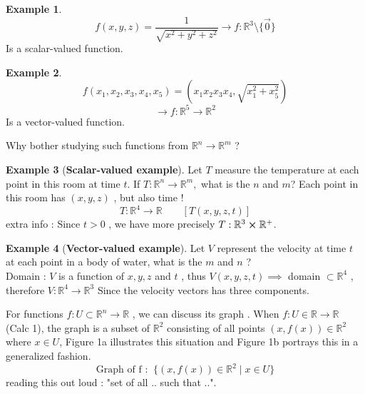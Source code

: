 \documentclass[
	12pt,
	]{article}
\newcommand{\Rn}{\mathbb{R}^{n}}
\newcommand{\R}{\mathbb{R}}
\newcommand{\Rm}{\mathbb{R}^{m}}
\theoremstyle{custom}
\theoremstyle{custom}
\theoremstyle{custom}
\theoremstyle{custom}
\theoremstyle{custom}
\theoremstyle{definition}
\newtheorem{example}{Example}[section]
\theoremstyle{example}
\theoremstyle{note}
\theoremstyle{remark}
\theoremstyle{example}
\newcounter{theo}[section]\setcounter{theo}{0}
\numberwithin{equation}{subsection}
\begin{document}
	\begin{example}
		$$ f(x,y,z) = \frac{1}{\sqrt{x^{2}+y^{2}+z^{2}}} \xrightarrow{} f: \mathbb{R}^{3} \text{\textbackslash}  \{\vec{0}\} $$ 
		Is a scalar-valued function.
	\end{example}
	
	\begin{example}
		$$ f(x_{1} , x_{2}, x_{3},x_{4},x_{5}) = \left(x_{1}x_{2}x_{3}x_{4} , \sqrt{x_{1}^{2}+x_{5}^{2}}\right)$$
		$$ \xrightarrow{	} f: \mathbb{R}^{5} \to \mathbb{R}^{2}$$
		Is a vector-valued function.
	\end{example}
	
	\noindent Why bother studying such functions from $ \Rn \to \Rm $ ? 
	
	\begin{example}[\textbf{Scalar-valued example}] 
		Let $ T $ measure the temperature at each point in this room at time $t$. If $ T : \Rn \to \Rm, $ what is the $n$ and $ m $? Each point in this room has $(x,y,z) $ , but also time !
			$$ T : \mathbb{R}^{4} \to \mathbb{R} \qquad [T(x,y,z,t)]$$
			extra info : Since $t>0$ , we have more precisely $T : \mathbb{R}^{3} \cross \mathbb{R}^{+}$.
	\end{example}
	
	\begin{example}[\textbf{Vector-valued example}] 
		Let $V$ represent the velocity at time $t$ at each point in a body of water, what is the $m$ and $n$ ? \\
			Domain : $V$ is a function of $x,y,z$ and $t$ , thus $V(x,y,z,t) \implies$ domain $\subset  \mathbb{R}^{4}$ , therefore $V : \mathbb{R}^{4} \to \mathbb{R}^{3}$ Since the velocity vectors has three components.
	\end{example}
	
	 For functions $f: U \subset \Rn \to \R$ , we can discuss its graph . When $f : U \in \R \to \R$ (Calc 1), the graph is a subset of $\mathbb{R}^{2}$ consisting of all points $(x,f(x)) \in \mathbb{R}^{2}$ where $x\in U$, Figure 1a illustrates this situation and Figure 1b portrays this in a generalized fashion. 
	$$ \text{Graph of f : } \ \{(x,f(x)) \in \mathbb{R}^{2} \mid x\in U\}$$
	reading this out loud : "set of all .. such that ..".
	
\end{document}
